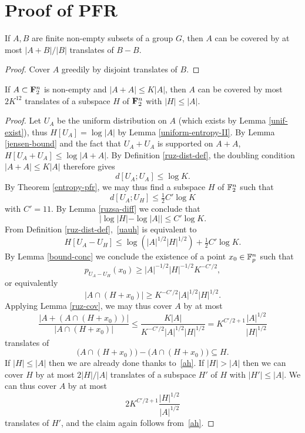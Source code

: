 \chapter{Proof of PFR}

\begin{lemma}
\label{ruz-cov}
\leanok
If $A,B$ are finite non-empty subsets of a group $G$, then $A$ can be covered by at most $|A+B|/|B|$ translates of $B-B$.
\end{lemma}
\begin{proof}
\leanok
Cover $A$ greedily by disjoint translates of $B$.
\end{proof}

\begin{theorem}[PFR]\label{pfr}
\leanok
If $A \subset {\bf F}_2^n$ is non-empty and $|A+A| \leq K|A|$, then $A$ can be covered by most $2K^{12}$ translates of a subspace $H$ of ${\bf F}_2^n$ with $|H| \leq |A|$.
\end{theorem}

\begin{proof}
  Let $U_A$ be the uniform distribution on $A$ (which exists by Lemma \ref{unif-exist}), thus $H[U_A] = \log |A|$ by Lemma \ref{uniform-entropy-II}. By Lemma \ref{jensen-bound} and the fact that $U_A + U_A$ is supported on $A + A$, $H[U_A + U_A] \leq \log|A+A|$. By Definition \ref{ruz-dist-def}, the doubling condition $|A+A| \leq K|A|$ therefore gives
  \[ d[U_A;U_A] \leq \log K.\]
  By Theorem \ref{entropy-pfr}, we may thus find a subspace $H$ of $\mathbb{F}_2^n$ such that
  \begin{equation}\label{uauh} d[U_A;U_H] \leq \tfrac{1}{2} C' \log K\end{equation}
  with $C' = 11$.
  By Lemma \ref{ruzsa-diff} we conclude that
  \begin{equation}\label{ah}
    |\log |H| - \log |A|| \leq C' \log K.
  \end{equation}
  From Definition \ref{ruz-dist-def},~\eqref{uauh} is equivalent to
  \[ H[U_A - U_H] \leq \log( |A|^{1/2} |H|^{1/2}) + \tfrac{1}{2} C' \log K.\]
  By Lemma \ref{bound-conc} we conclude the existence of a point $x_0 \in \mathbb{F}_p^n$ such that
  \[ p_{U_A-U_H}(x_0) \geq |A|^{-1/2} |H|^{-1/2} K^{-C'/2},\]
  or equivalently
  \[ |A \cap (H + x_0)| \geq K^{-C'/2} |A|^{1/2} |H|^{1/2}.\]
  Applying Lemma \ref{ruz-cov}, we may thus cover $A$ by at most
  \[ \frac{|A + (A \cap (H+x_0))|}{|A \cap (H + x_0)|} \leq \frac{K|A|}{K^{-C'/2} |A|^{1/2} |H|^{1/2}} = K^{C'/2+1} \frac{|A|^{1/2}}{|H|^{1/2}}\]
  translates of
  \[ \bigl(A \cap (H + x_0)\bigr) - \bigl(A \cap (H + x_0)\bigr) \subseteq H.\]
  If $|H| \leq |A|$ then we are already done thanks to~\eqref{ah}.  If $|H| > |A|$ then we can cover $H$ by at most $2 |H|/|A|$ translates of a subspace $H'$ of $H$ with $|H'| \leq |A|$.  We can thus cover $A$ by at most
  \[ 2K^{C'/2+1} \frac{|H|^{1/2}}{|A|^{1/2}}\]
  translates of $H'$, and the claim again follows from~\eqref{ah}.
\end{proof}
